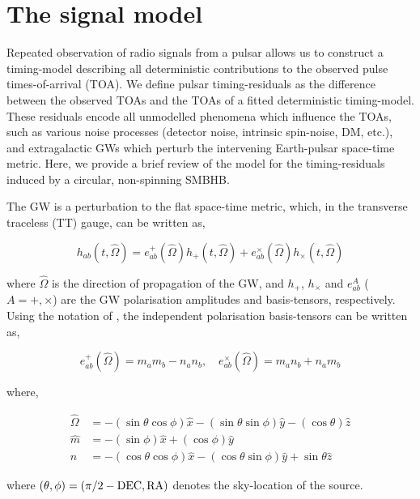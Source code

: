 \documentclass[prd,showpacs,nofootinbib]{revtex4}
\begin{document}
\section{The signal model}

Repeated observation of radio signals from a pulsar allows us to construct a timing-model describing all deterministic contributions to the observed pulse times-of-arrival (TOA). We define pulsar timing-residuals as the difference between the observed TOAs and the TOAs of a fitted deterministic timing-model. These residuals encode all unmodelled phenomena which influence the TOAs, such as various noise processes (detector noise, intrinsic spin-noise, DM, etc.), and extragalactic GWs which perturb the intervening Earth-pulsar space-time metric. Here, we provide a brief review of the model for the timing-residuals induced by a circular, non-spinning SMBHB. 

The GW is a perturbation to the flat space-time metric, which, in the transverse traceless (TT) gauge, can be written as,

\begin{equation}
h_{ab}(t,\hat\Omega) = e^+_{ab}(\hat\Omega)h_+(t,\hat\Omega) + e^\times_{ab}(\hat\Omega)h_\times(t,\hat\Omega)
\end{equation}

where $\hat\Omega$ is the direction of propagation of the GW, and $h_+$, $h_{\times}$ and $e^A_{ab}$ ($A=+,\times$) are the GW polarisation amplitudes and basis-tensors, respectively. Using the notation of \citet{wahlquist-1987}, the independent polarisation basis-tensors can be written as,

\begin{equation}
e^+_{ab}(\hat\Omega) = m_am_b - n_an_b,\quad e^\times_{ab}(\hat\Omega) = m_an_b + n_am_b
\end{equation}

where,

\begin{align}
\hat\Omega &= -(\sin\theta\cos\phi)\hat{x} - (\sin\theta\sin\phi)\hat{y} - (\cos\theta)\hat{z} \\\nonumber
\hat{m} &= -(\sin\phi)\hat{x} + (\cos\phi)\hat{y} \\\nonumber
\hat{n} &= -(\cos\theta\cos\phi)\hat{x} - (\cos\theta\sin\phi)\hat{y} + \sin\theta\hat{z}
\end{align}

where $(\theta,\phi) = (\pi/2 - {\rm DEC}, {\rm RA})$ denotes the sky-location of the source.
\end{document}
